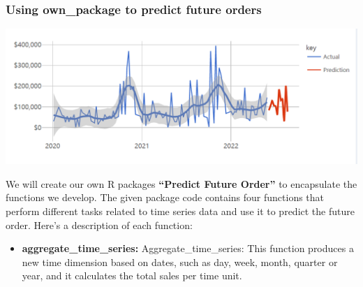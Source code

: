\documentclass[
  11pt,
]{article}
\providecommand{\tightlist}{%
  \setlength{\itemsep}{0pt}\setlength{\parskip}{0pt}}\usepackage{longtable,booktabs,array}
\begin{document}
\hypertarget{using-own_package-to-predict-future-orders}{%
\subsubsection{Using own\_package to predict future
orders}\label{using-own_package-to-predict-future-orders}}

\includegraphics{img/line1.png}

We will create our own R packages \textbf{``Predict Future Order''} to
encapsulate the functions we develop. The given package code contains
four functions that perform different tasks related to time series data
and use it to predict the future order. Here's a description of each
function:

\begin{itemize}
\tightlist
\item
  \textbf{aggregate\_time\_series:} Aggregate\_time\_series: This
  function produces a new time dimension based on dates, such as day,
  week, month, quarter or year, and it calculates the total sales per
  time unit.
\end{itemize}
\end{document}
